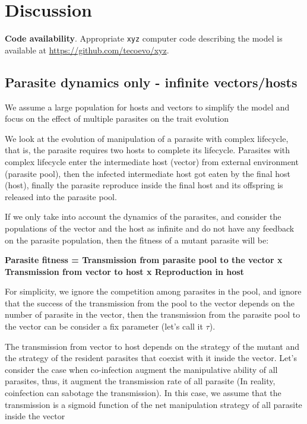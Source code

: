 \documentclass{article}
\begin{document}
\section{Discussion}

\textbf{Code availability}.
Appropriate {\tt{xyz}} computer code describing the model is available at {\url{https://github.com/tecoevo/xyz}}.







\appendix

\subsection{Parasite dynamics only - infinite vectors/hosts}

We assume a large population for hosts and vectors to simplify the model and focus on the effect of multiple parasites on the trait evolution

We look at the evolution of manipulation of a parasite with complex lifecycle, that is, the parasite requires two hosts to complete its lifecycle. Parasites with complex lifecycle enter the intermediate host (vector) from external environment (parasite pool), then the infected intermediate host got eaten by the final host (host), finally the parasite reproduce inside the final host and its offspring is released into the parasite pool.

If we only take into account the dynamics of the parasites, and consider the populations of the vector and the host as infinite and do not have any feedback on the parasite population, then the fitness of a mutant parasite will be:

\textbf{Parasite fitness = Transmission from parasite pool to the vector x Transmission from vector to host x Reproduction in host}

For simplicity, we ignore the competition among parasites in the pool, and ignore that the success of the transmission from the pool to the vector depends on the number of parasite in the vector, then the transmission from the parasite pool to the vector can be consider a fix parameter (let's call it $\tau$).

The transmission from vector to host depends on the strategy of the mutant and the strategy of the resident parasites that coexist with it inside the vector. Let's consider the case when co-infection augment the manipulative ability of all parasites, thus, it augment the transmission rate of all parasite (In reality, coinfection can sabotage the transmission). In this case, we assume that the transmission is a sigmoid function of the net manipulation strategy of all parasite inside the vector
\end{document}
